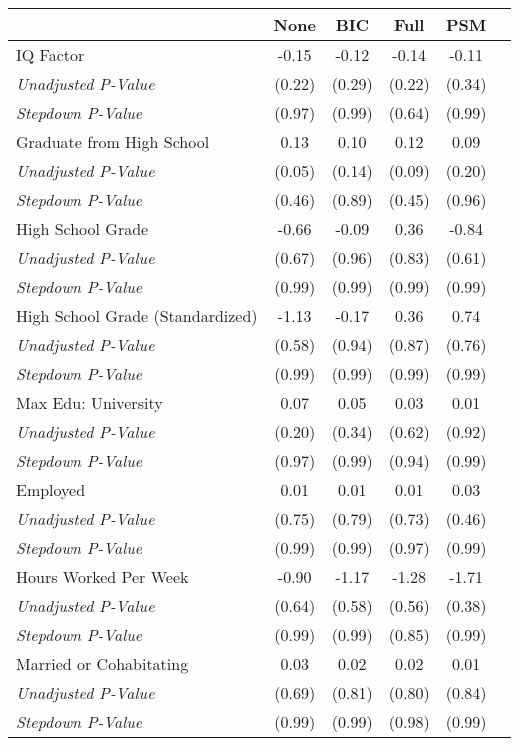 \begin{tabular}{l c c c c c}
\toprule
 & None & BIC & Full & PSM \\
\midrule
IQ Factor & -0.15 & -0.12 & -0.14 & -0.11 \\
\quad \textit{Unadjusted P-Value} & (0.22) & (0.29) & (0.22) & (0.34) \\
\quad \textit{Stepdown P-Value} & (0.97) & (0.99) & (0.64) & (0.99) \\
Graduate from High School & 0.13 & 0.10 & 0.12 & 0.09 \\
\quad \textit{Unadjusted P-Value} & (0.05) & (0.14) & (0.09) & (0.20) \\
\quad \textit{Stepdown P-Value} & (0.46) & (0.89) & (0.45) & (0.96) \\
High School Grade & -0.66 & -0.09 & 0.36 & -0.84 \\
\quad \textit{Unadjusted P-Value} & (0.67) & (0.96) & (0.83) & (0.61) \\
\quad \textit{Stepdown P-Value} & (0.99) & (0.99) & (0.99) & (0.99) \\
High School Grade (Standardized) & -1.13 & -0.17 & 0.36 & 0.74 \\
\quad \textit{Unadjusted P-Value} & (0.58) & (0.94) & (0.87) & (0.76) \\
\quad \textit{Stepdown P-Value} & (0.99) & (0.99) & (0.99) & (0.99) \\
Max Edu: University & 0.07 & 0.05 & 0.03 & 0.01 \\
\quad \textit{Unadjusted P-Value} & (0.20) & (0.34) & (0.62) & (0.92) \\
\quad \textit{Stepdown P-Value} & (0.97) & (0.99) & (0.94) & (0.99) \\
Employed & 0.01 & 0.01 & 0.01 & 0.03 \\
\quad \textit{Unadjusted P-Value} & (0.75) & (0.79) & (0.73) & (0.46) \\
\quad \textit{Stepdown P-Value} & (0.99) & (0.99) & (0.97) & (0.99) \\
Hours Worked Per Week & -0.90 & -1.17 & -1.28 & -1.71 \\
\quad \textit{Unadjusted P-Value} & (0.64) & (0.58) & (0.56) & (0.38) \\
\quad \textit{Stepdown P-Value} & (0.99) & (0.99) & (0.85) & (0.99) \\
Married or Cohabitating & 0.03 & 0.02 & 0.02 & 0.01 \\
\quad \textit{Unadjusted P-Value} & (0.69) & (0.81) & (0.80) & (0.84) \\
\quad \textit{Stepdown P-Value} & (0.99) & (0.99) & (0.98) & (0.99) \\

\end{tabular}
